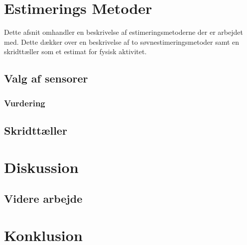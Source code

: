 \chapter{Estimerings Metoder}
Dette afsnit omhandler en beskrivelse af estimeringsmetoderne der er arbejdet med.
Dette dækker over en beskrivelse af to søvnestimeringsmetoder samt en skridttæller som et estimat for fysisk aktivitet.
\section{Valg af sensorer}


\subsection{Vurdering}
\section{Skridttæller}
\chapter{Diskussion}
\section{Videre arbejde}
\chapter{Konklusion}



\label{bib:mybiblio}

\appendix

